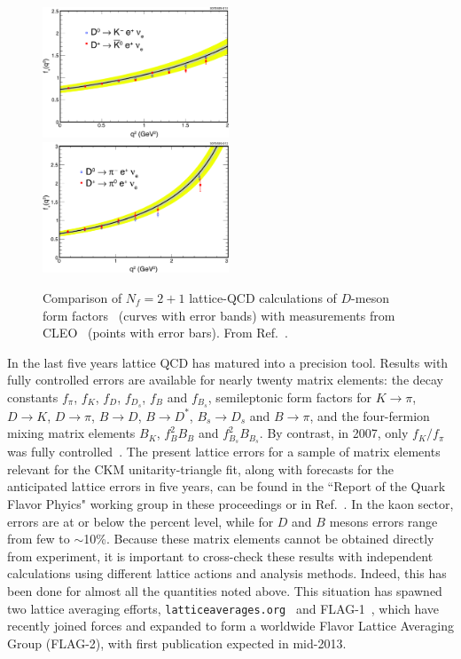 \begin{figure}
    \centering
    \includegraphics[width=0.495\textwidth]{CpF-T3/D2K.pdf}\hfill
    \includegraphics[width=0.495\textwidth]{CpF-T3/D2pi.pdf}
    \caption[Lattice-QCD calculations of $D$-meson form factors compared with measurements]{Comparison of 
        $N_f = 2+1$ lattice-QCD calculations of $D$-meson form factors~\cite{Aubin:2004ej,Bernard:2009ke} 
        (curves with error bands) with measurements from CLEO~\cite{Besson:2009uv} (points with error bars).
        From Ref.~\cite{Besson:2009uv}.}
    \label{lqcd:fig:D2K}
\end{figure}

In the last five years lattice QCD has matured into a precision tool.
Results with fully controlled errors are available
for nearly twenty matrix elements:
the decay constants
$f_\pi$, $f_K$, $f_D$, $f_{D_s}$, $f_B$ and $f_{B_s}$, 
semileptonic form factors for
$K\to \pi$, $D \to K$, $D\to\pi$, 
$B\to D$, $B\to D^{*}$, $B_s\to D_s$ and $B\to\pi$,
and the four-fermion mixing matrix elements
$B_K$, $f_B^2 B_B$ and $f_{B_s}^2 B_{B_s}$.
By contrast, in 2007, 
only $f_K/f_\pi$ was fully controlled~\cite{whitepaper07}.
The present lattice errors for a sample of matrix elements relevant for the CKM unitarity-triangle fit, along with forecasts for the anticipated lattice errors in five years, can be found in the ``Report of the Quark Flavor Phyics" working group in these proceedings or in Ref.~\cite{USQCD_IF_whitepaper13}.
In the kaon sector, errors are at or below the percent level,
while for $D$ and $B$ mesons errors range from few to $\sim$10\%.  Because these matrix elements cannot be obtained directly from experiment,  it is important to cross-check these results with independent calculations using different lattice actions and analysis methods.  Indeed, this has been done for almost all the quantities noted above. 
This situation has spawned two lattice averaging efforts, 
{\tt latticeaverages.org}~\cite{Laiho:2009eu} and 
FLAG-1~\cite{Colangelo:2010et}, 
which have recently joined forces and expanded to form a worldwide
Flavor Lattice Averaging Group (FLAG-2), 
with first publication expected in mid-2013.

